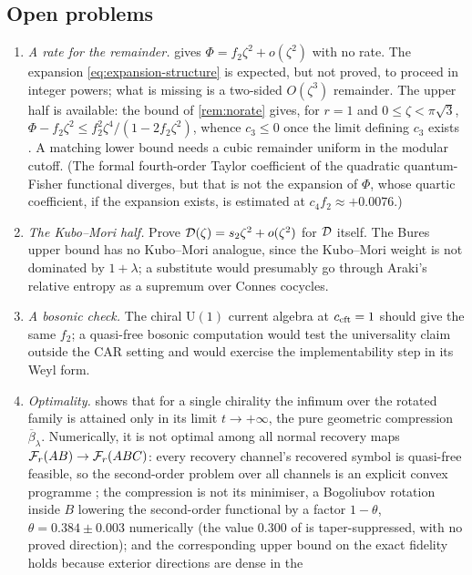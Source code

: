 \subsection{Open problems}
\begin{enumerate}[label=(O\arabic*),leftmargin=2.6em]
\item \emph{A rate for the remainder.}   gives
$\Phi=f_2\zeta^2+o(\zeta^2)$ with no rate.  The expansion
\eqref{eq:expansion-structure} is expected, but not proved, to proceed in integer powers; what is missing is a
two-sided $O(\zeta^3)$ remainder.  The upper half is available: the bound of
\cref{rem:norate} gives, for $r=1$ and $0\le\zeta<\pi\sqrt3$, $\Phi-f_2\zeta^2\le f_2^2\zeta^4/(1-2f_2\zeta^2)$, whence
$c_3\le0$ once the limit defining $c_3$ exists \cite{RigorRR}.  A matching lower
bound needs a cubic remainder uniform in the modular cutoff.  (The formal
fourth-order Taylor coefficient of the quadratic quantum-Fisher functional
diverges, but that is not the expansion of $\Phi$, whose quartic coefficient, if the expansion exists, is
estimated at $c_4f_2\approx+0.0076$.)
\item \emph{The Kubo--Mori half.}  Prove $\mathcal D(\zeta)=s_2\zeta^2+o(\zeta^2)$ for
$\mathcal D$ itself.  The Bures upper bound has no Kubo--Mori analogue, since the
Kubo--Mori weight is not dominated by $1+\lambda$; a substitute would presumably
go through Araki's relative entropy as a supremum over Connes cocycles.
\item \emph{A bosonic check.}  The chiral $\mathrm U(1)$ current algebra at
$c_{\rm cft}=1$ should give the same $f_2$; a quasi-free bosonic computation would
test the universality claim outside the CAR setting and would exercise the
implementability step in its Weyl form.
\item \emph{Optimality.}   shows that for a single chirality the infimum over the
rotated family is attained only in its limit $t\to+\infty$, the pure geometric compression
$\overline\beta_\lambda$.  Numerically, it is not optimal among all normal recovery maps
$\mathcal F_r(AB)\to\mathcal F_r(ABC)$: every recovery channel's recovered symbol is quasi-free
feasible, so the second-order problem over all channels is an explicit convex
programme \cite{RigorAll}; the compression is not its minimiser, a Bogoliubov
rotation inside $B$ lowering the second-order functional by a factor $1-\theta$,
$\theta=0.384\pm0.003$ numerically \cite{RigorAll,RigorF3} (the value $0.300$ of \cite{RigorS10} is taper-suppressed, with no proved direction); and the corresponding
upper bound on the exact fidelity holds because exterior directions are dense in the

\end{enumerate}
